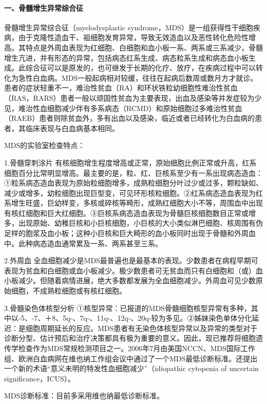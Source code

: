 \paragraph{一、骨髓增生异常综合征}

骨髓增生异常综合征（myelodysplastic
syndrome，MDS）是一组获得性干细胞疾病，由于克隆性造血干、祖细胞发育异常，导致无效造血以及恶性转化危险性增高。其特点是外周血表现为红细胞、白细胞和血小板一系、两系或三系减少，骨髓增生亢进，并有形态的异常，包括病态红系生成、病态粒系生成和病态血小板生成。此综合征可以是原发的，也可继发于长期的化疗、放疗，在疾病过程中可以转化为急性白血病。MDS一般起病相对较缓，往往在起病后数周或数月方才就诊。患者的症状轻重不一，难治性贫血（RA）和环状铁粒幼细胞性难治性贫血（RAS，RARS）患者一般以顽固性贫血为主要表现，出血及感染等并发症较为少见，难治性血细胞减少伴有多系病态（RCMD）和原始细胞过多难治性贫血（RAEB）患者则除贫血外，多有出血以及感染，临近或者已经转化为白血病的患者，其临床表现与白血病基本相同。

MDS的实验室检查特点：

1.骨髓穿刺涂片
有核细胞增生程度增高或正常，原始细胞比例正常或升高，红系细胞百分比常明显增高。最主要的是，粒、红、巨核系至少有一系出现病态造血：①粒系病态造血表现为原始粒细胞增多，成熟粒细胞分叶过少或过多，颗粒缺如、减少或增多，幼粒细胞出现巨型变，可见环形核粒细胞。②红系病态造血表现为红系增生旺盛，巨幼样变，多核或碎核等畸形，成熟红细胞大小不等，周围血中出现有核红细胞和巨大红细胞。③巨核系病态造血表现为骨髓巨核细胞数目正常或增多，出现原始、幼稚巨核和小巨核细胞，小巨核的大小类似淋巴细胞、核周围有伪足样的胞浆及血小板；这种小巨核和巨大畸形的血小板同时出现于骨髓和外周血中。此种病态造血通常累及一系、两系甚至三系。

2.外周血
全血细胞减少是MDS最普遍也是最基本的表现。少数患者在病程早期可表现为贫血和白细胞或血小板减少。极少数患者可无贫血而只有白细胞和（或）血小板减少。但随着病情进展，绝大多数都发展为全血细胞减少。外周血可见少数原始细胞，不成熟粒细胞或有核红细胞。

3.骨髓染色体核型分析
①核型异常：已报道的MDS骨髓细胞核型异常有多种，其中以-5、-7、＋8、5q-、7q-、11q-、12q-、20q-较为多见。②姊妹染色单体分化延迟：是细胞周期延长的反应。MDS患者有无染色体核型异常以及异常的类型对于诊断分型、估计预后和治疗决策都具有极为重要的意义。因此，现已推荐将细胞遗传学检查作为MDS常规检测项目之一。2006年7月由美国NCCN、MDS国际工作组、欧洲白血病网在维也纳工作组会议中通过了一个MDS最低诊断标准。还提出一个新的术语“意义未明的特发性血细胞减少”（idiopathic
cytopenia of uncertain significance，ICUS）。

MDS诊断标准：目前多采用维也纳最低诊断标准。

